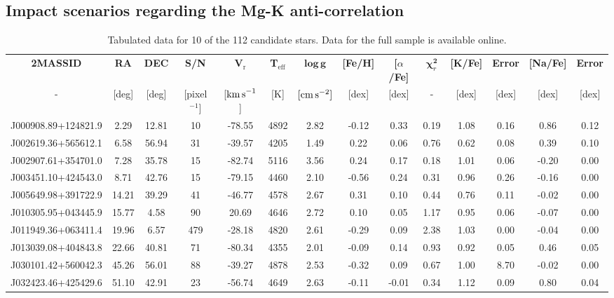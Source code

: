\documentclass[a4paper,fleqn,usenatbib]{mnras}
\begin{document}
\subsection{Impact scenarios regarding the Mg-K anti-correlation}

\label{sec:scenarios}
\begin{table}
\centering
\caption{Tabulated data for 10 of the 112 candidate stars. Data for the full sample is available online.}
\label{data}
\begin{tabular}{cccccccccccccc}
\hline
\textbf{2MASSID} & \textbf{RA} & \textbf{DEC} & \textbf{S/N} & \textbf{V$_\textrm{r}$} & \textbf{T$_\textrm{eff}$} & $\boldsymbol \log{ \, \textbf{g}}$ & \textbf{{[}Fe/H{]}} & \textbf{{[}$\alpha$/Fe{]}} & \textbf{$\boldsymbol \chi_r ^\textbf{2}$} & \textbf{{[}K/Fe{]}} & \textbf{Error} & \textbf{{[}Na/Fe{]}} & \textbf{Error} \\ 
- & {[}deg{]} & {[}deg{]} & [pixel$^{-1}]$ & {[${\rm km\,s}^{-1}$]} & {[}K{]} & $[{\rm cm\,s}^{-2}]$ & {[}dex{]} & {[}dex{]} & - & {[}dex{]} & {[}dex{]} & {[}dex{]} & {[}dex{]} \\ \hline
J000908.89+124821.9 & 2.29 & 12.81 & 10 & -78.55 & 4892 & 2.82 & -0.12 & 0.33 & 0.19 & 1.08 & 0.16 & 0.86 & 0.12 \\
J002619.36+565612.1 & 6.58 & 56.94 & 31 & -39.57 & 4205 & 1.49 & 0.22 & 0.06 & 0.76 & 0.62 & 0.08 & 0.39 & 0.10 \\
J002907.61+354701.0 & 7.28 & 35.78 & 15 & -82.74 & 5116 & 3.56 & 0.24 & 0.17 & 0.18 & 1.01 & 0.06 & -0.20 & 0.00 \\
J003451.10+424543.0 & 8.71 & 42.76 & 15 & -79.15 & 4460 & 2.10 & -0.56 & 0.24 & 0.31 & 0.96 & 0.26 & -0.16 & 0.00 \\
J005649.98+391722.9 & 14.21 & 39.29 & 41 & -46.77 & 4578 & 2.67 & 0.31 & 0.10 & 0.44 & 0.76 & 0.11 & -0.02 & 0.00 \\
J010305.95+043445.9 & 15.77 & 4.58 & 90 & 20.69 & 4646 & 2.72 & 0.10 & 0.05 & 1.17 & 0.95 & 0.06 & -0.07 & 0.00 \\
J011949.36+063411.4 & 19.96 & 6.57 & 479 & -28.18 & 4820 & 2.61 & -0.29 & 0.09 & 2.38 & 1.03 & 0.00 & -0.04 & 0.00 \\
J013039.08+404843.8 & 22.66 & 40.81 & 71 & -80.34 & 4355 & 2.01 & -0.09 & 0.14 & 0.93 & 0.92 & 0.05 & 0.46 & 0.05 \\
J030101.42+560042.3 & 45.26 & 56.01 & 88 & -39.27 & 4878 & 2.53 & -0.32 & 0.09 & 0.67 & 1.00 & 8.70 & -0.02 & 0.00 \\
J032423.46+425429.6 & 51.10 & 42.91 & 23 & -56.74 & 4649 & 2.63 & -0.11 & -0.01 & 0.34 & 1.12 & 0.09 & 0.80 & 0.04 \\ \hline
\end{tabular}
\end{table}
\end{document}
